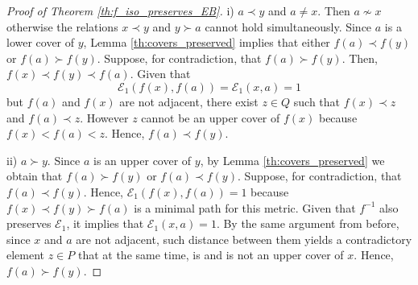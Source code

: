 \documentclass{article}[12pt]
\theoremstyle{exampstyle}
\theoremstyle{remark}
\newcommand{\E}{\mathcal{E}}
\begin{document}
\begin{proof}[Proof of Theorem \ref{th:f_iso_preserves_EB}]
    \begin{minipage}{0.81\textwidth}
        i) $a \prec y$ and $a \neq x$. Then $a \nsim x$ otherwise the relations $x \prec y$ and $y \succ a$ cannot hold simultaneously. Since $a$ is a  lower cover of $y$, Lemma \ref{th:covers_preserved} implies that either $f(a) \prec f(y)$ or \mbox{$f(a) \succ f(y)$}. Suppose, for contradiction, that $f(a) \succ f(y)$. Then, $f(x) \prec f(y) \prec f(a)$. Given that \[\E_1(f(x),f(a)) = \E_1(x,a) =  1\] but $f(a)$ and $f(x)$ are not adjacent, there exist $z \in Q$ such that $f(x) \prec z$ and $f(a) \prec z$. However $z$ cannot be an upper cover of $f(x)$ because $f(x) < f(a) < z$. Hence, $f(a) \prec f(y)$.
    \end{minipage}
    \hfill
    \begin{minipage}{0.15\textwidth}
    \end{minipage}
    
     \begin{minipage}{0.81\textwidth}
        ii) $a \succ y$. Since $a$ is an upper cover of $y$, by Lemma \ref{th:covers_preserved}  we obtain that $f(a) \succ f(y)$ or $f(a) \prec f(y)$. Suppose, for contradiction, that $f(a) \prec f(y)$. Hence, $\E_1(f(x),f(a)) = 1$ because $f(x) \prec f(y) \succ f(a)$ is a minimal path for this metric. Given that $f^{-1}$ also preserves $\E_1$, it implies that $\E_1(x,a) = 1$. By the same argument from before, since  $x$ and  $a$ are not adjacent, such distance between them yields a contradictory element $z \in P$ that at the same time, is and is not an upper cover of $x$. Hence, $f(a) \succ f(y)$.
     \end{minipage}
      \hfill
     \begin{minipage}{0.15\textwidth}
     \end{minipage}
     

\end{proof}
\end{document}

